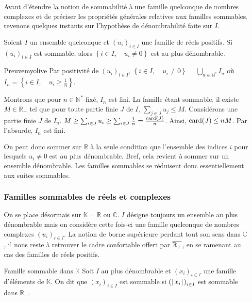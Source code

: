     Avant d’étendre la notion de sommabilité à une famille quelconque de nombres complexes et de préciser les propriétés générales relatives aux familles sommables, revenons quelques instants sur l’hypothèse de dénombrabilité faite sur $I$.

    \begin{prop}{}{}
        Soient $I$ un ensemble quelconque et $(u_i)_{i \in I}$ une famille de réels positifs. Si $(u_i)_{i \in I}$ est sommable, alors $\left\{i \in I, \quad u_i \neq 0\right\}$ est au plus dénombrable.
    \end{prop}

    \begin{demo}{Preuve}{myolive}
        Par positivité de $(u_i)_{i \in I}$, $\left\{i \in I, \quad u_i \neq 0\right\}= \bigcup_{n \in \mathbb{N}^*} I_n$ où $I_n = \left\{i \in I, \quad u_i \geq \frac{1}{n}\right\}$. 

        Montrons que pour $n \in \mathbb{N}^*$ fixé, $I_n$ est fini. La famille étant sommable, il existe $M \in \mathbb{R}_+$ tel que pour toute partie finie $J$ de $I$, $\sum_{j \in J} u_j \leq M$. Considérons une partie finie $J$ de $I_n$. $M \geq \sum_{i \in J} u_i \geq \sum_{i \in J} \frac{1}{n} = \frac{\operatorname{card}(J)}{n}$. Ainsi, $\operatorname{card}(J) \leq nM$. Par l’absurde, $I_n$ est fini.
    \end{demo}

    On peut donc sommer sur $\mathbb{R}$ à la seule condition que l’ensemble des indices $i$ pour lesquels $u_i \neq 0$ est au plus dénombrable. Bref, cela revient à sommer sur un ensemble dénombrable. Les familles sommables se réduisent donc essentiellement aux suites sommables.

    \subsubsection{Familles sommables de réels et complexes}

    On se place désormais sur $\mathbb{K} = \mathbb{R}$ ou $\mathbb{C}$. $I$ désigne toujours un ensemble au plus dénombrable mais on considère cette fois-ci une famille quelconque de nombres complexes $(u_i)_{i \in I}$. La notion de borne supérieure perdant tout son sens dans $\mathbb{C}$, il nous reste à retrouver le cadre confortable offert par $\overline{\mathbb{R}_+}$, en se ramenant au cas des familles de réels positifs.

    \begin{defi}{Famille sommable dans $\mathbb{K}$}{}
        Soit $I$ au plus dénombrable et $(x_i)_{i \in I}$ une famille d’éléments de $\mathbb{K}$. On dit que $(x_i)_{i \in I}$ est sommable si $\left(\left\lvert \,x_i \, \right\rvert\right)_{i \in I}$ est sommable dans $\mathbb{R}_+$. 
    \end{defi}

